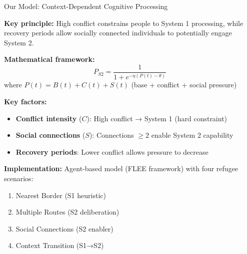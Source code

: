 \documentclass[aspectratio=169]{beamer}
\begin{document}
\begin{frame}{Our Model: Context-Dependent Cognitive Processing}

\textbf{Key principle:} High conflict constrains people to System 1 processing, while recovery periods allow socially connected individuals to potentially engage System 2.

\vspace{0.5em}

\textbf{Mathematical framework:}
\begin{equation*}
P_{S2} = \frac{1}{1 + e^{-\eta(P(t) - \theta)}}
\end{equation*}
where $P(t) = B(t) + C(t) + S(t)$ (base + conflict + social pressure)

\vspace{0.5em}

\textbf{Key factors:}
\begin{itemize}
    \item \textbf{Conflict intensity} ($C$): High conflict → System 1 (hard constraint)
    \item \textbf{Social connections} ($S$): Connections $\geq 2$ enable System 2 capability
    \item \textbf{Recovery periods}: Lower conflict allows pressure to decrease
\end{itemize}

\vspace{0.5em}

\textbf{Implementation:} Agent-based model (FLEE framework) with four refugee scenarios:
\begin{enumerate}
    \item Nearest Border (S1 heuristic)
    \item Multiple Routes (S2 deliberation)
    \item Social Connections (S2 enabler)
    \item Context Transition (S1→S2)
\end{enumerate}

\end{frame}
\end{document}

